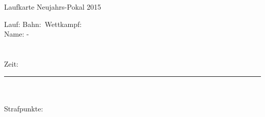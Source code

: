 \documentclass[a4paper, 10pt, landscape]{article}
\newcommand*{\PrintName}[1]
{%
	\ifthenelse
		{\DTLisieq{#1}{}}
		{-}
		{#1}
}%
\begin{document}
{

\fontsize{40}{36} \selectfont
\begin{center}
	Laufkarte Neujahrs-Pokal 2015
\end{center}
\vspace{1cm}
Lauf: \dlauf\hfill Bahn:\ \dbahn\hfill Wettkampf:\ \dwk \\
Name: \PrintName{\dname} \\ \\ \\
Zeit: 
\rule{\textwidth}{1pt} \\ \\
Strafpunkte:
\newpage

}


\vfill
\end{document}
